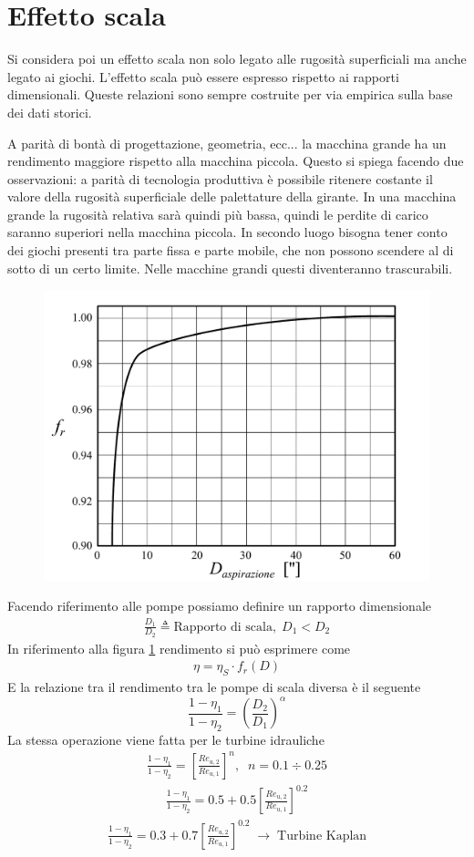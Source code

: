 \section{Effetto scala}
Si considera poi un effetto scala non solo legato alle rugosità superficiali ma anche legato ai giochi. L'effetto scala può essere espresso rispetto ai rapporti dimensionali. Queste relazioni sono sempre costruite per via empirica sulla base dei dati storici.

A parità di bontà di progettazione, geometria, ecc... la macchina grande ha un rendimento maggiore rispetto alla macchina piccola. Questo si spiega facendo due osservazioni: a parità di tecnologia produttiva è possibile ritenere costante il valore della rugosità superficiale delle palettature della girante. In una macchina grande la rugosità relativa sarà quindi più bassa, quindi le perdite di carico saranno superiori nella macchina piccola. In secondo luogo bisogna tener conto dei giochi presenti tra parte fissa e parte mobile, che non possono scendere al di sotto di un certo limite. Nelle macchine grandi questi diventeranno trascurabili. 
\begin{figure}
\centering
  \includegraphics[width=.5\textwidth]{fig/dDchart.pdf}
\caption{}
\label{fig:dDchart}
\end{figure}

Facendo riferimento alle pompe possiamo definire un rapporto dimensionale 
\begin{align*}
\frac{D_1}{D_2} \triangleq  \mbox{Rapporto di scala}, \; D_1 < D_2
\end{align*}
In riferimento alla figura \ref{fig:dDchart} rendimento si può esprimere come
\begin{align*}
\eta = \eta_S \cdot f_r(D)
\end{align*}
E la relazione tra il rendimento tra le pompe di scala diversa è il seguente
\begin{equation}
\frac{1-\eta_1}{1-\eta_2} = \left( \frac{D_2}{D_1}\right)^\alpha
\end{equation}
La stessa operazione viene fatta per le turbine idrauliche
\begin{align*}
\frac{1-\eta_1}{1-\eta_2} = \left[ \frac{Re_{u,2}}{Re_{u,1}} \right]^n, \; \; n=0.1 \div 0.25
\end{align*}
\begin{align*}
\frac{1-\eta_1}{1-\eta_2} =0.5 + 0.5 \left[ \frac{Re_{u,2}}{Re_{u,1}} \right]^{0.2}
\end{align*}
\begin{align*}
\frac{1-\eta_1}{1-\eta_2} = 0.3 + 0.7 \left[ \frac{Re_{u,2}}{Re_{u,1}} \right]^{0.2} \; \to \; \mbox{Turbine Kaplan}
\end{align*}

